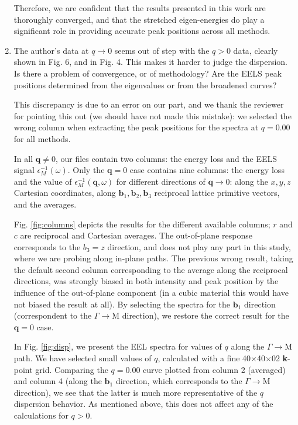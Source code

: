 \documentclass[aps,prb,10pt,endfloats]{revtex4-1}
\begin{document}
\begin{enumerate}
\begin{shaded*}
Therefore, we are confident that the results presented in this work are
thoroughly converged, and that the stretched eigen-energies do play a
significant role in providing accurate peak positions across all methods.
\end{shaded*}

\item
The author's data at $q\rightarrow0$ seems out of step with the $q>0$ data,
clearly shown in Fig. 6, and in Fig. 4. This makes it harder to judge the
dispersion. Is there a problem of convergence, or of methodology? Are the EELS
peak positions determined from the eigenvalues or from the broadened curves?
\begin{shaded*}
This discrepancy is due to an error on our part, and we thank the reviewer for 
pointing this out (we should have not made this mistake): we selected the 
wrong column when extracting the peak positions for the spectra at $q=0.00$ 
for all methods.

In all $\mathbf{q}\ne 0$, our files contain two columns: the energy loss and the
EELS signal $\epsilon_{M}^{-1}(\omega)$. Only the $\mathbf{q}=0$ case contains
nine columns: the energy loss and the value of
$\epsilon_M^{-1}(\mathbf{q},\omega)$ for different directions of $\mathbf{q}\to
0$: along the $x, y, z$ Cartesian coordinates, along
$\mathbf{b}_{1},\mathbf{b}_{2},\mathbf{b}_{3}$ reciprocal lattice primitive
vectors, and the averages.

Fig. \ref{fig:columns} depicts the results for the different available columns;
$r$ and $c$ are reciprocal and Cartesian averages. The out-of-plane response
corresponds to the $b_{3} = z$ direction, and does not play any part in this
study, where we are probing along in-plane paths. The previous wrong result,
taking the default second column corresponding to the average along the
reciprocal directions, was strongly biased in both intensity and peak position
by the influence of the out-of-plane component (in a cubic material this would
have not biased the result at all). By selecting the spectra for the
$\mathbf{b}_{1}$ direction (correspondent to the $\Gamma\to\mathrm{M}$
direction), we restore the correct result for the $\mathbf{q} = 0$ case.

In Fig. \ref{fig:disp}, we present the EEL spectra for values of $q$ along the
$\Gamma\rightarrow\mathrm{M}$ path. We have selected small values of $q$,
calculated with a fine 40$\times$40$\times$02 \textbf{k}-point grid. Comparing
the $q=0.00$ curve plotted from column 2 (averaged) and column 4 (along the
$\mathbf{b}_{1}$ direction, which corresponds to the $\Gamma\to\mathrm{M}$
direction), we see that the latter is much more representative of the $q$
dispersion behavior. As mentioned above, this does not affect any of the
calculations for $q > 0$.


\end{shaded*}
\end{enumerate}
\end{document}
